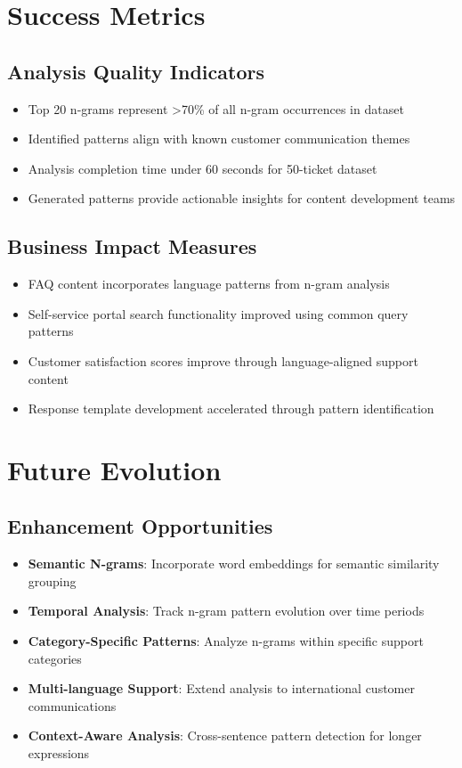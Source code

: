 \documentclass[11pt]{article}
\begin{document}
\section{Success Metrics}

\subsection{Analysis Quality Indicators}
\begin{itemize}
\item Top 20 n-grams represent >70\% of all n-gram occurrences in dataset
\item Identified patterns align with known customer communication themes
\item Analysis completion time under 60 seconds for 50-ticket dataset
\item Generated patterns provide actionable insights for content development teams
\end{itemize}

\subsection{Business Impact Measures}
\begin{itemize}
\item FAQ content incorporates language patterns from n-gram analysis
\item Self-service portal search functionality improved using common query patterns
\item Customer satisfaction scores improve through language-aligned support content
\item Response template development accelerated through pattern identification
\end{itemize}

\section{Future Evolution}

\subsection{Enhancement Opportunities}
\begin{itemize}
\item \textbf{Semantic N-grams}: Incorporate word embeddings for semantic similarity grouping
\item \textbf{Temporal Analysis}: Track n-gram pattern evolution over time periods
\item \textbf{Category-Specific Patterns}: Analyze n-grams within specific support categories
\item \textbf{Multi-language Support}: Extend analysis to international customer communications
\item \textbf{Context-Aware Analysis}: Cross-sentence pattern detection for longer expressions
\end{itemize}
\end{document}
